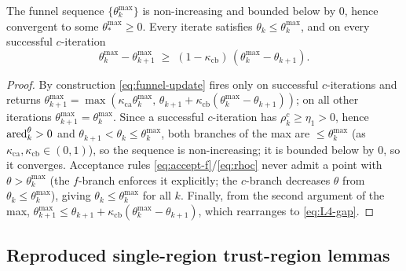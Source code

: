 \begin{lemma}[L4]
  \label{lem:L4}
  The funnel sequence $\{\theta_k^{\max}\}$ is non-increasing and bounded below by
  $0$, hence convergent to some $\theta_*^{\max}\ge0$. Every iterate satisfies
  $\theta_k\le\theta_k^{\max}$, and on every successful $c$-iteration
  \begin{equation}
    \label{eq:L4-gap}
    \theta_k^{\max}-\theta_{k+1}^{\max}
      \;\ge\; (1-\kappa_{\mathrm{cb}})\,(\theta_k^{\max}-\theta_{k+1}).
  \end{equation}
\end{lemma}
\begin{proof}
  By construction \eqref{eq:funnel-update} fires only on successful $c$-iterations
  and returns $\theta_{k+1}^{\max}=\max(\kappa_{\mathrm{ca}}\theta_k^{\max},\,
  \theta_{k+1}+\kappa_{\mathrm{cb}}(\theta_k^{\max}-\theta_{k+1}))$; on all other
  iterations $\theta_{k+1}^{\max}=\theta_k^{\max}$. Since a successful $c$-iteration
  has $\rho^c_k\ge\eta_1>0$, hence $\operatorname{ared}^\theta_k>0$ and $\theta_{k+1}<\theta_k
  \le\theta_k^{\max}$, both branches of the max are $\le\theta_k^{\max}$
  (as $\kappa_{\mathrm{ca}},\kappa_{\mathrm{cb}}\in(0,1)$), so the sequence is
  non-increasing; it is bounded below by $0$, so it converges. Acceptance rules
  \eqref{eq:accept-f}/\eqref{eq:rhoc} never admit a point with $\theta>\theta_k^{\max}$
  (the $f$-branch enforces it explicitly; the $c$-branch decreases $\theta$ from
  $\theta_k\le\theta_k^{\max}$), giving $\theta_k\le\theta_k^{\max}$ for all $k$.
  Finally, from the second argument of the max,
  $\theta_{k+1}^{\max}\le\theta_{k+1}+\kappa_{\mathrm{cb}}(\theta_k^{\max}-\theta_{k+1})$,
  which rearranges to \eqref{eq:L4-gap}.
\end{proof}

\subsection{Reproduced single-region trust-region lemmas}
\label{sec:tr-lemmas}

